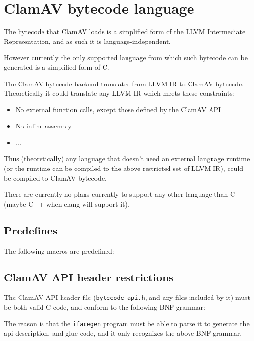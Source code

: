 \chapter{ClamAV bytecode language}
The bytecode that ClamAV loads is a simplified form of the LLVM Intermediate Representation, and as such it is language-independent.

However currently the only supported language from which such bytecode can be
generated is a simplified form of C.

The ClamAV bytecode backend translates from LLVM IR to ClamAV bytecode.
Theoretically it could translate any LLVM IR which meets these constraints:
\begin{itemize}
\item No external function calls, except those defined by the ClamAV API
\item No inline assembly
\item ...
\end{itemize}

Thus (theoretically) any language that doesn't need an external language runtime (or
the runtime can be compiled to the above restricted set of LLVM IR), could be
compiled to ClamAV bytecode.

There are currently no plans currently to support any other language than C (maybe C++ when
clang will support it).

\section{Predefines}
The following macros are predefined:
\lstset{basicstyle=\tiny}

\lstset{basicstyle=\footnotesize}

\section{ClamAV API header restrictions}
The ClamAV API header file (\verb+bytecode_api.h+, and any files included by it) must be both valid C code, and conform to the following BNF grammar:

The reason is that the \verb+ifacegen+ program must be able to parse it to
generate the api description, and glue code, and it only recognizes the above
BNF grammar.

